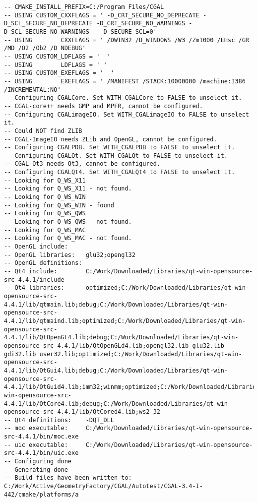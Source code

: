 {\begin{verbatim}
-- CMAKE_INSTALL_PREFIX=C:/Program Files/CGAL
-- USING CUSTOM_CXXFLAGS = ' -D_CRT_SECURE_NO_DEPRECATE -D_SCL_SECURE_NO_DEPRECATE -D_CRT_SECURE_NO_WARNINGS -D_SCL_SECURE_NO_WARNINGS   -D_SECURE_SCL=0'
-- USING        CXXFLAGS = ' /DWIN32 /D_WINDOWS /W3 /Zm1000 /EHsc /GR /MD /O2 /Ob2 /D NDEBUG'
-- USING CUSTOM_LDFLAGS = '  '
-- USING        LDFLAGS = ' '
-- USING CUSTOM_EXEFLAGS = '  '
-- USING        EXEFLAGS = ' /MANIFEST /STACK:10000000 /machine:I386 /INCREMENTAL:NO'
-- Configuring CGALCore. Set WITH_CGALCore to FALSE to unselect it.
-- CGAL-core++ needs GMP and MPFR, cannot be configured.
-- Configuring CGALimageIO. Set WITH_CGALimageIO to FALSE to unselect it.
-- Could NOT find ZLIB
-- CGAL-ImageIO needs ZLib and OpenGL, cannot be configured.
-- Configuring CGALPDB. Set WITH_CGALPDB to FALSE to unselect it.
-- Configuring CGALQt. Set WITH_CGALQt to FALSE to unselect it.
-- CGAL-Qt3 needs Qt3, cannot be configured.
-- Configuring CGALQt4. Set WITH_CGALQt4 to FALSE to unselect it.
-- Looking for Q_WS_X11
-- Looking for Q_WS_X11 - not found.
-- Looking for Q_WS_WIN
-- Looking for Q_WS_WIN - found
-- Looking for Q_WS_QWS
-- Looking for Q_WS_QWS - not found.
-- Looking for Q_WS_MAC
-- Looking for Q_WS_MAC - not found.
-- OpenGL include:     
-- OpenGL libraries:   glu32;opengl32
-- OpenGL definitions: 
-- Qt4 include:        C:/Work/Downloaded/Libraries/qt-win-opensource-src-4.4.1/include
-- Qt4 libraries:      optimized;C:/Work/Downloaded/Libraries/qt-win-opensource-src-4.4.1/lib/qtmain.lib;debug;C:/Work/Downloaded/Libraries/qt-win-opensource-src-4.4.1/lib/qtmaind.lib;optimized;C:/Work/Downloaded/Libraries/qt-win-opensource-src-4.4.1/lib/QtOpenGL4.lib;debug;C:/Work/Downloaded/Libraries/qt-win-opensource-src-4.4.1/lib/QtOpenGLd4.lib;opengl32.lib glu32.lib gdi32.lib user32.lib;optimized;C:/Work/Downloaded/Libraries/qt-win-opensource-src-4.4.1/lib/QtGui4.lib;debug;C:/Work/Downloaded/Libraries/qt-win-opensource-src-4.4.1/lib/QtGuid4.lib;imm32;winmm;optimized;C:/Work/Downloaded/Libraries/qt-win-opensource-src-4.4.1/lib/QtCore4.lib;debug;C:/Work/Downloaded/Libraries/qt-win-opensource-src-4.4.1/lib/QtCored4.lib;ws2_32
-- Qt4 definitions:    -DQT_DLL
-- moc executable:     C:/Work/Downloaded/Libraries/qt-win-opensource-src-4.4.1/bin/moc.exe
-- uic executable:     C:/Work/Downloaded/Libraries/qt-win-opensource-src-4.4.1/bin/uic.exe
-- Configuring done
-- Generating done
-- Build files have been written to: C:/Work/Active/GeometryFactory/CGAL/Autotest/CGAL-3.4-I-442/cmake/platforms/a
\end{verbatim}
}





